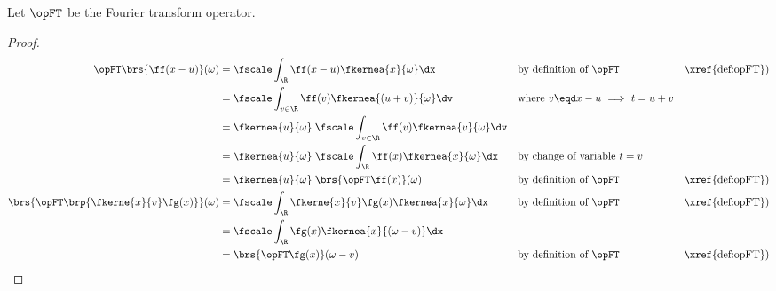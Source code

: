 \begin{theorem}
\label{thm:ft_shift}
Let $\opFT$ be the Fourier transform operator.
\renewcommand{\arraystretch}{1.25}
\renewcommand{\arraystretch}{1}
\end{theorem}
\begin{proof}
\begin{align*}
  \opFT \brs{\ff(x-u)}(\omega)
    &= \fscale \int_\R \ff(x-u) \fkernea{x}{\omega} \dx
    && \text{by definition of $\opFT$}
    && \text{\xref{def:opFT})}
  \\&= \fscale \int_{v\in\R} \ff(v) \fkernea{(u+v)}{\omega} \dv
    && \text{where $v\eqd x-u$ $\implies$ $t=u+v$}
  \\&= \fkernea{u}{\omega} \;\fscale \int_{v\in\R} \ff(v)  \fkernea{v}{\omega} \dv
  \\&= \fkernea{u}{\omega} \;\fscale \int_\R \ff(x)  \fkernea{x}{\omega} \dx
    && \text{by change of variable $t=v$}
  \\&= \fkernea{u}{\omega} \;\brs{\opFT \ff(x)}(\omega)
    && \text{by definition of $\opFT$}
    && \text{\xref{def:opFT})}
  \\
  \brs{\opFT\brp{\fkerne{x}{v} \fg(x)}}(\omega)
    &= \fscale \int_\R \fkerne{x}{v} \fg(x) \fkernea{x}{\omega} \dx
    && \text{by definition of $\opFT$}
    && \text{\xref{def:opFT})}
  \\&= \fscale \int_\R \fg(x) \fkernea{x}{(\omega-v)} \dx
  \\&= \brs{\opFT\fg(x)}(\omega-v)
    && \text{by definition of $\opFT$}
    && \text{\xref{def:opFT})}
\end{align*}
\end{proof}



